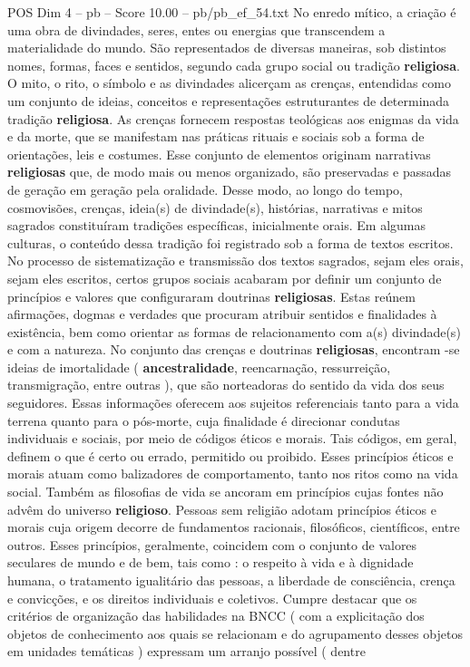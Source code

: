 \begin{textsample}{POS Dim 4 – pb – Score 10.00 – pb/pb\_ef\_54.txt}
No enredo mítico, a criação é uma obra de divindades, seres, entes ou energias que transcendem a materialidade do mundo.
São representados de diversas maneiras, sob distintos nomes, formas, faces e sentidos, segundo cada grupo social ou tradição \textbf{religiosa}.
O mito, o rito, o símbolo e as divindades alicerçam as crenças, entendidas como um conjunto de ideias, conceitos e representações estruturantes de determinada tradição \textbf{religiosa}.
As crenças fornecem respostas teológicas aos enigmas da vida e da morte, que se manifestam nas práticas rituais e sociais sob a forma de orientações, leis e costumes.
Esse conjunto de elementos originam narrativas \textbf{religiosas} que, de modo mais ou menos organizado, são preservadas e passadas de geração em geração pela oralidade.
Desse modo, ao longo do tempo, cosmovisões, crenças, ideia(s) de divindade(s), histórias, narrativas e mitos sagrados constituíram tradições específicas, inicialmente orais.
Em algumas culturas, o conteúdo dessa tradição foi registrado sob a forma de textos escritos.
No processo de sistematização e transmissão dos textos sagrados, sejam eles orais, sejam eles escritos, certos grupos sociais acabaram por definir um conjunto de princípios e valores que configuraram doutrinas \textbf{religiosas}.
Estas reúnem afirmações, dogmas e verdades que procuram atribuir sentidos e finalidades à existência, bem como orientar as formas de relacionamento com a(s) divindade(s) e com a natureza.
No conjunto das crenças e doutrinas \textbf{religiosas}, encontram -se ideias de imortalidade ( \textbf{ancestralidade}, reencarnação, ressurreição, transmigração, entre outras ), que são norteadoras do sentido da vida dos seus seguidores.
Essas informações oferecem aos sujeitos referenciais tanto para a vida terrena quanto para o pós-morte, cuja finalidade é direcionar condutas individuais e sociais, por meio de códigos éticos e morais.
Tais códigos, em geral, definem o que é certo ou errado, permitido ou proibido.
Esses princípios éticos e morais atuam como balizadores de comportamento, tanto nos ritos como na vida social.
Também as filosofias de vida se ancoram em princípios cujas fontes não advêm do universo \textbf{religioso}.
Pessoas sem religião adotam princípios éticos e morais cuja origem decorre de fundamentos racionais, filosóficos, científicos, entre outros.
Esses princípios, geralmente, coincidem com o conjunto de valores seculares de mundo e de bem, tais como : o respeito à vida e à dignidade humana, o tratamento igualitário das pessoas, a liberdade de consciência, crença e convicções, e os direitos individuais e coletivos.
Cumpre destacar que os critérios de organização das habilidades na BNCC ( com a explicitação dos objetos de conhecimento aos quais se relacionam e do agrupamento desses objetos em unidades temáticas ) expressam um arranjo possível ( dentre

\end{textsample}
